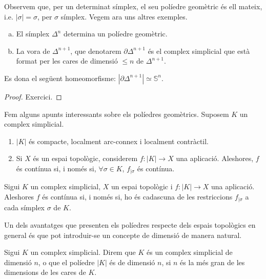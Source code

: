 \documentclass[../main.tex]{subfiles}
\begin{document}
Observem que, per un determinat símplex, el seu políedre geomètric és ell mateix, i.e. $|\sigma| = \sigma$, per $\sigma$ símplex. Vegem ara uns altres exemples.

\begin{ej}
\label{ej:poliedregeometric} 
\begin{enumerate}[(a)]
    \item El símplex $\Delta^n$ determina un políedre geomètric.
    \item La vora de $\Delta^{n+1}$, que denotarem $\partial\Delta^{n+1}$ és el complex simplicial que està format per les cares de dimensió $\leq n$ de $\Delta^{n+1}$.
\end{enumerate}
\end{ej}


\begin{nota}
Es dona el següent homeomorfisme: $|\partial\Delta^{n+1}|\simeq \mathbb{S}^n$.
\end{nota}
\begin{proof}
Exercici.
\end{proof}

\begin{nota}\label{nota:poliedresgeometrics}
Fem alguns apunts interessants sobre els políedres geomètrics. Suposem $K$ un complex simplicial.
\begin{enumerate}[(1)]
    \item $|K|$ és compacte, localment arc-connex i localment contràctil.
    \item Si $X$ és un espai topològic, considerem $f:|K|\rightarrow X$ una aplicació. Aleshores, $f$ és contínua si, i només si, $\forall \sigma\in K$, $f_{|\sigma}$ és contínua.
\end{enumerate}
\end{nota}


\begin{coro}
Sigui $K$ un complex simplicial, $X$ un espai topològic i $f:|K|\rightarrow X$ una aplicació. Aleshores $f$ és contínua si, i només si, ho és cadascuna de les restriccions $f_{|\sigma}$ a cada símplex $\sigma$ de $K$.
\end{coro}

Un dels avantatges que presenten els políedres respecte dels espais topològics en general és que pot introduir-se un concepte de dimensió de manera natural.

Sigui $K$ un complex simplicial. Direm que $K$ és un complex simplicial de dimensió $n$, o que el políedre $|K|$ és de dimensió $n$, si $n$ és la més gran de les dimensions de les cares de $K$.
\end{document}
